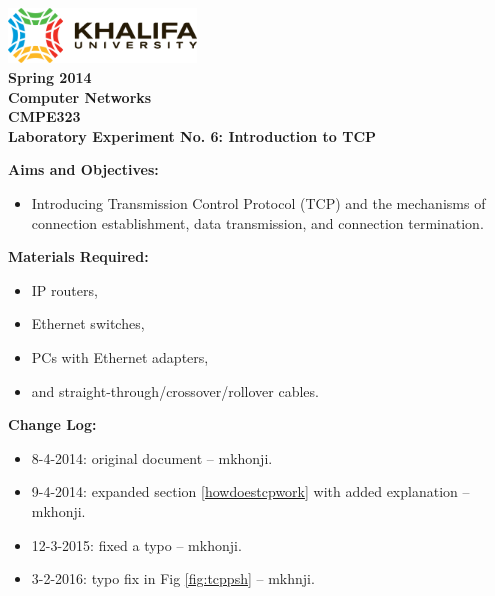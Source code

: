 \documentclass[pdftex,12pt,a4paper]{article}
\begin{document}
    \begin{titlepage}
        \begin{center}
            \includegraphics[width=5cm]{figures/kulogo}\\[1cm]
            {\Large \bfseries
                Spring 2014\\
                Computer Networks\\
                CMPE323\\[1cm]
            }
            {\large \bfseries
                \noindent Laboratory Experiment No. 6: Introduction to TCP\\[1cm]
            }
        \end{center}

        \noindent \textbf{Aims and Objectives:}
            \begin{itemize}[leftmargin=4cm]
                \item Introducing Transmission Control Protocol (TCP) and the
                    mechanisms of connection establishment, data transmission,
                    and connection termination.
            \end{itemize}
            \vspace{0.5cm}

        \noindent \textbf{Materials Required:}
            \begin{itemize}[leftmargin=4cm]
                \item IP routers,
                \item Ethernet switches,
                \item PCs with Ethernet adapters,
                \item and straight-through/crossover/rollover cables.
            \end{itemize}
            \vspace{0.5cm}

        \noindent \textbf{Change Log:}
            \begin{itemize}[leftmargin=4cm]
                \item 8-4-2014: original document -- mkhonji.
                \item 9-4-2014: expanded section \ref{howdoestcpwork} with
                    added explanation --
                    mkhonji.
                \item 12-3-2015: fixed a typo -- mkhonji.
                \item 3-2-2016: typo fix in Fig \ref{fig:tcppsh} -- mkhnji.
            \end{itemize}
    \end{titlepage}
    \newpage
\end{document}
